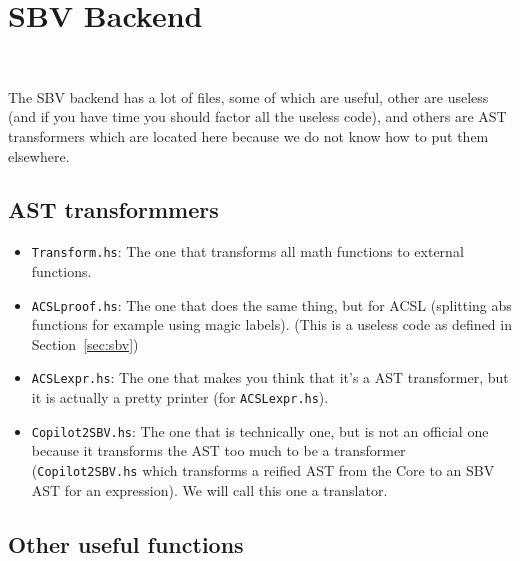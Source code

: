 \section{SBV Backend}~\label{sec:sbv}


The SBV backend has a lot of files, some of which are useful, other are useless (and if you have time you should factor all the useless code), and others are AST transformers which are located here because we do not know how to put them elsewhere. 

\subsection{AST transformmers}

\begin{itemize}
	\item \texttt{Transform.hs}: The one that transforms all math functions to external functions.
	\item \texttt{ACSLproof.hs}: The one that does the same thing, but for ACSL (splitting abs functions for example using magic labels). (This is a useless code as defined in Section~\ref{sec:sbv})
	\item \texttt{ACSLexpr.hs}: The one that makes you think that it's a AST transformer, but it is actually a pretty printer (for \texttt{ACSLexpr.hs}).
	\item \texttt{Copilot2SBV.hs}: The one that is technically one, but is not an official one because it transforms the AST too much to be a transformer (\texttt{Copilot2SBV.hs} which transforms a reified AST from the Core to an SBV AST for an expression). We will call this one a translator.
\end{itemize}

\subsection{Other useful functions}

